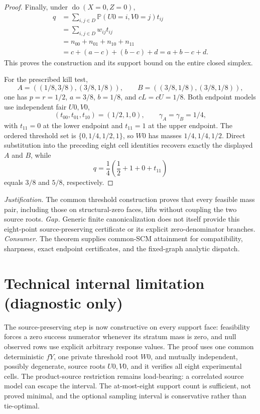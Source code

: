 \documentclass{article}
\begin{document}
\begin{proof}
Finally, under \(\operatorname{do}(X=0,Z=0)\),
\[
\begin{aligned}
q
&=\sum_{i,j\in D}\mathbb P(U0=i,V0=j)t_{ij}\\
&=\sum_{i,j\in D}w_{ij}t_{ij}\\
&=n_{00}+n_{01}+n_{10}+n_{11}\\
&=c+(a-c)+(b-c)+d=a+b-c+d.
\end{aligned}
\]
This proves the construction and its support bound on the entire closed simplex.

For the prescribed kill test,
\[
A=((1/8,3/8),(3/8,1/8)),
\qquad
B=((3/8,1/8),(3/8,1/8)),
\]
one has \(p=r=1/2\), \(a=3/8\), \(b=1/8\), and \(cL=cU=1/8\).  Both endpoint models use independent fair \(U0,V0\),
\[
(t_{00},t_{01},t_{10})=(1/2,1,0),
\qquad
\gamma_A=\gamma_B=1/4,
\]
with \(t_{11}=0\) at the lower endpoint and \(t_{11}=1\) at the upper endpoint.  The ordered threshold set is \(\{0,1/4,1/2,1\}\), so \(W0\) has masses \(1/4,1/4,1/2\).  Direct substitution into the preceding eight cell identities recovers exactly the displayed \(A\) and \(B\), while
\[
q=\frac14\left(\frac12+1+0+t_{11}\right)
\]
equals \(3/8\) and \(5/8\), respectively.
\end{proof}
\par\smallskip\noindent \textit{Justification.} The common threshold construction proves that every feasible mass pair, including those on structural-zero faces, lifts without coupling the two source roots. \textit{Gap.} Generic finite canonicalization does not itself provide this eight-point source-preserving certificate or its explicit zero-denominator branches. \textit{Consumer.} The theorem supplies common-SCM attainment for compatibility, sharpness, exact endpoint certificates, and the fixed-graph analytic dispatch.

\section*{Technical internal limitation (diagnostic only)}

The source-preserving step is now constructive on every support face: feasibility forces a zero success numerator whenever its stratum mass is zero, and null observed rows use explicit arbitrary response values.  The proof uses one common deterministic \(fY\), one private threshold root \(W0\), and mutually independent, possibly degenerate, source roots \(U0,V0\), and it verifies all eight experimental cells.  The product-source restriction remains load-bearing: a correlated source model can escape the interval.  The at-most-eight support count is sufficient, not proved minimal, and the optional sampling interval is conservative rather than tie-optimal.
\end{document}
